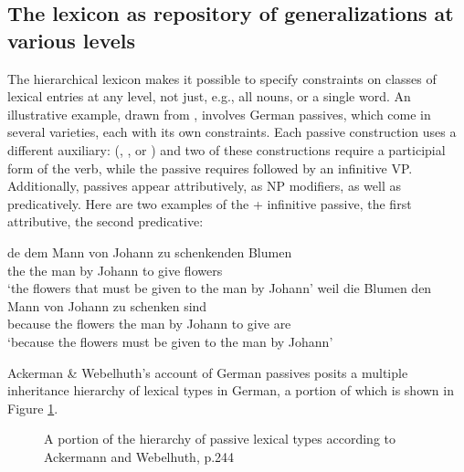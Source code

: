 \documentclass[output=paper]{langsci/langscibook}
\begin{document}
\subsection{The lexicon as repository of generalizations at various levels}

The hierarchical lexicon makes it possible to specify constraints on classes of lexical entries at any level, not just, e.g., all nouns, or a single word.
An illustrative example, drawn from , involves German passives, which come in several varieties, each with its own constraints.
Each passive construction uses a different auxiliary: (, , or ) and two of these constructions require a participial form of the verb, while the  passive requires  followed by an infinitive VP.
Additionally, passives appear attributively, as NP modifiers, as well as predicatively.
Here are two examples of the  + infinitive passive, the first attributive, the second predicative:

\begin{exe}
	\ex\label{zu-pass}
	\begin{xlist}
		\ex\label{zu-pass-a}
		\gll de dem Mann von Johann zu schenkenden Blumen \\
		the the man by Johann to give flowers  \\
		\glt `the flowers that must be given to the man by Johann'
		\ex\label{zu-pass-b}
		\gll weil die Blumen den Mann von Johann zu schenken sind \\
		because the flowers the man by Johann to give are \\
		\glt `because the flowers must be given to the man by Johann'
	\end{xlist}
\end{exe}

Ackerman \& Webelhuth's account of German passives posits a multiple inheritance hierarchy of lexical types in German, a portion of which is shown in Figure \ref{fig:pass-hier}.


\begin{figure}
	\caption{\label{fig:pass-hier}A portion of the hierarchy of passive lexical types according to Ackermann and Webelhuth, p.244}	
\end{figure}
\end{document}
